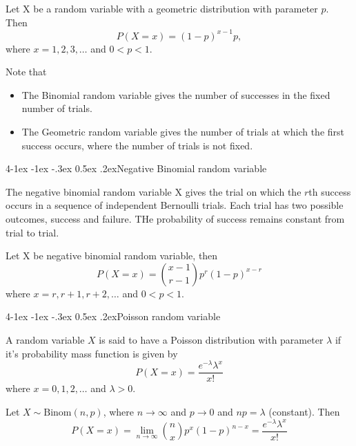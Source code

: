 \documentclass{tufte-handout}
\makeatletter
\renewcommand{\paragraph}{\@startsection{paragraph}%
    {4}{\z@}{-1ex \@plus -1ex \@minus -.3ex}%
    {0.5ex \@plus .2ex}{\normalfont\normalsize\bfseries}}
\makeatother
\begin{document}
\begin{Theorem}
    Let X be a random variable with a geometric distribution with parameter \( p \).
    Then
    \[P(X=x) = (1-p)^{x-1}p,\]
    where \( x = 1,2,3,\ldots \) and \( 0 < p < 1 \).
\end{Theorem}

Note that
\begin{itemize}
    \item The Binomial random variable gives the number of successes in the fixed number of trials.
    \item The Geometric random variable gives the number of trials at which the first success occurs,
    where the number of trials is not fixed.
\end{itemize}

\paragraph{Negative Binomial random variable}
\begin{Definition}
    The negative binomial random variable X gives the trial on which
    the \( r \)th success occurs in a sequence of independent Bernoulli trials.
    Each trial has two possible outcomes, success and failure. THe probability
    of success remains constant from trial to trial.
\end{Definition}

\begin{Theorem}
    Let X be negative binomial random variable, then
    \[ P(X = x) = \binom{x-1}{r-1} p^r (1-p)^{x-r} \]
    where \( x = r, r+1, r+2, \ldots \) and \( 0 < p < 1 \).
\end{Theorem}

\paragraph{Poisson random variable}
\begin{Definition}
    A random variable \( X \) is said to have a Poisson distribution with parameter \( \lambda \)
    if it's probability mass function is given by
    \[ P(X = x) = \frac{e^{-\lambda} \lambda^x}{x!} \]
    where \( x = 0,1,2,\ldots \) and \( \lambda > 0 \).
\end{Definition}

\begin{Theorem}
    Let \( X \sim \text{Binom}(n,p)\), where \( n \rightarrow \infty \) and \( p \rightarrow 0 \)
    and \( np = \lambda \) (constant). Then
    \[ P(X = x) = \lim_{n \rightarrow \infty} \binom{n}{x} p^x (1-p)^{n-x} = \frac{e^{-\lambda} \lambda^x}{x!} \]
\end{Theorem}
\end{document}
